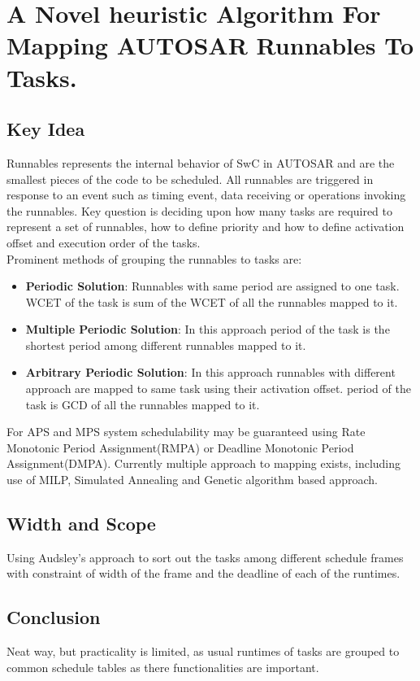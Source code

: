 \section{A Novel heuristic Algorithm For Mapping AUTOSAR Runnables To Tasks.}

\subsection*{Key Idea}
Runnables represents the internal behavior of SwC in AUTOSAR and are the smallest pieces of the code to be scheduled.
All runnables are triggered in response to an event such as timing event, data receiving or operations invoking the runnables.
Key question is deciding upon how many tasks are required to represent a set of runnables, how to define priority and how to define activation offset and execution order of the tasks.\\
Prominent methods of grouping the runnables to tasks are:
\begin{itemize}
	\item \textbf{{Periodic Solution}}: Runnables with same period are assigned to one task. WCET of the task is sum of the WCET of all the runnables mapped to it.
	\item \textbf{Multiple Periodic Solution}: In this approach period of the task is the shortest period among different runnables mapped to it.
	\item \textbf{Arbitrary Periodic Solution}: In this approach runnables with different approach are mapped to same task using their activation offset. period of the task is GCD of all the runnables mapped to it.
\end{itemize}
For APS and MPS system schedulability may be guaranteed using Rate Monotonic Period Assignment(RMPA) or Deadline Monotonic Period Assignment(DMPA).
Currently multiple approach to mapping exists, including use of MILP, Simulated Annealing and Genetic algorithm based approach.

\subsection*{Width and Scope}
Using Audsley's approach to sort out the tasks among different schedule frames with constraint of width of the frame and the deadline of each of the runtimes.

\subsection*{Conclusion}
Neat way, but practicality is limited, as usual runtimes of tasks are grouped to common schedule tables as there functionalities are important.